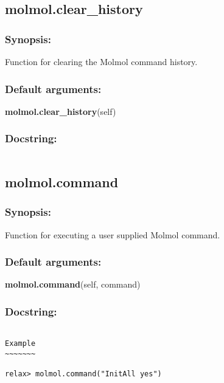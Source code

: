 \newpage

\subsection{molmol.clear\_history}


\subsubsection{Synopsis:}

Function for clearing the Molmol command history.

\subsubsection{Default arguments:}

\textsf{\textbf{molmol.clear\_history}(self)
}


\subsubsection{Docstring:}

{\scriptsize
\begin{verbatim}

\end{verbatim}
}



\newpage

\subsection{molmol.command}


\subsubsection{Synopsis:}

Function for executing a user supplied Molmol command.

\subsubsection{Default arguments:}

\textsf{\textbf{molmol.command}(self, command)
}


\subsubsection{Docstring:}

{\scriptsize
\begin{verbatim}

Example
~~~~~~~

relax> molmol.command("InitAll yes")
\end{verbatim}
}



